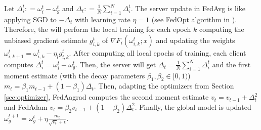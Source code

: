 Let $\Delta_i^t \colon = \omega_i^t - \omega_g^t$ and $\Delta_t \colon = \frac{1}{N} \sum_{i=1}^N \Delta_i^t$. The server update in FedAvg is like applying SGD to $-\Delta_t$ with learning rate $\eta=1$ (see FedOpt algorithm in \cite{reddi2021}). Therefore, the will perform the local training for each epoch $k$ computing the unbiased gradient estimate $g_{i,k}^t$ of $\nabla F_i(\omega_{i,k}^t; x)$ and updating the weights $\omega_{i,k+1}^t = \omega_{i,k}^t - \eta_l g_{i,k}^t$. After computing all local epochs of training, each client computes $\Delta_i^t = \omega_i^t - \omega_g^t$. Then, the server will get $\Delta_t = \frac{1}{N}\sum_{i=1}^N \Delta_i^t$ and the first moment estimate (with the decay parameters $\beta_1,\beta_2 \in [0,1)$) $m_t = \beta_1 m_{t-1} + (1-\beta_1)\Delta_t$. Then, adapting the optimizers from Section \ref{sec:optimizer}, FedAagrad computes the second moment estimate $v_t = v_{t-1} + \Delta_t^2$ and FedAdam $v_t = \beta_2 v_{t-1} + (1-\beta_2)\Delta_t^2$. Finally, the global model is updated $\omega_g^{t+1} = \omega_g^t + \eta \frac{m_t}{\sqrt{v_t} + \epsilon}$.
